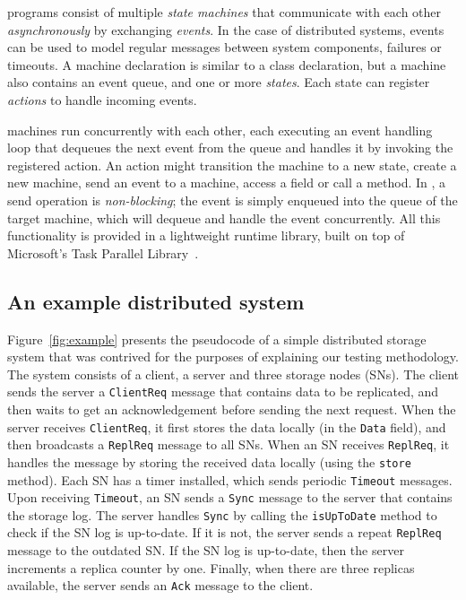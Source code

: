 \psharp programs consist of multiple \emph{state machines} that communicate with each other \emph{asynchronously} by exchanging \emph{events}. In the case of distributed systems, \psharp events can be used to model regular messages between system components, failures or timeouts. A \psharp machine declaration is similar to a \csharp class declaration, but a machine also contains an event queue, and one or more \emph{states}. Each state can register \emph{actions} to handle incoming events.

\psharp machines run concurrently with each other, each executing an event handling loop that dequeues the next event from the queue and handles it by invoking the registered action. An action might transition the machine to a new state, create a new machine, send an event to a machine, access a field or call a method. In \psharp, a send operation is \emph{non-blocking}; the event is simply enqueued into the queue of the target machine, which will dequeue and handle the event concurrently. All this functionality is provided in a lightweight runtime library, built on top of Microsoft's Task Parallel Library~\cite{leijen2009tpl}.

\vspace{-2mm}
\subsection{An example distributed system}
\label{sec:overview:example}

Figure~\ref{fig:example} presents the pseudocode of a simple distributed storage system that was contrived for the purposes of explaining our testing methodology. The system consists of a client, a server and three storage nodes (SNs). The client sends the server a \texttt{ClientReq} message that contains data to be replicated, and then waits to get an acknowledgement before sending the next request. When the server receives \texttt{ClientReq}, it first stores the data locally (in the \texttt{Data} field), and then broadcasts a \texttt{ReplReq} message to all SNs. When an SN receives \texttt{ReplReq}, it handles the message by storing the received data locally (using the \texttt{store} method). Each SN has a timer installed, which sends periodic \texttt{Timeout} messages. Upon receiving \texttt{Timeout}, an SN sends a \texttt{Sync} message to the server that contains the storage log. The server handles \texttt{Sync} by calling the \texttt{isUpToDate} method to check if the SN log is up-to-date. If it is not, the server sends a repeat \texttt{ReplReq} message to the outdated SN. If the SN log is up-to-date, then the server increments a replica counter by one. Finally, when there are three replicas available, the server sends an \texttt{Ack} message to the client.

